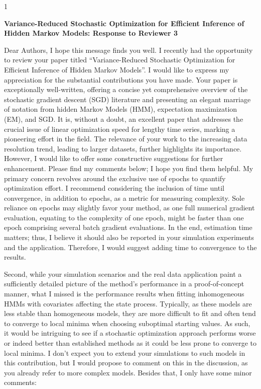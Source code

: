 \documentclass[11pt]{article}
\newcommand{\blind}{1}
\begin{document}
\blind
{
  \bigskip
  \bigskip
  \bigskip
  \begin{center}
    {\LARGE\bf Variance-Reduced Stochastic Optimization for Efficient Inference of Hidden Markov Models: Response to Reviewer 3}
  \end{center}
  \medskip
} \fi

Dear Authors,
I hope this message finds you well. I recently had the opportunity to review your paper titled “Variance-Reduced Stochastic Optimization for Efficient Inference of Hidden Markov Models”. I would like to express my appreciation for the substantial contributions you have made. Your paper is exceptionally well-written, offering a concise yet comprehensive overview of the stochastic gradient descent (SGD) literature and presenting an elegant marriage of notation from hidden Markov Models (HMM), expectation maximization (EM), and SGD. It is, without a doubt, an excellent paper that addresses the crucial issue of linear optimization speed for lengthy time series, marking a pioneering effort in the field. The relevance of your work to the increasing data resolution trend, leading to larger datasets, further highlights its importance. However, I would like to offer some constructive suggestions for further enhancement. Please find my comments below; I hope you find them helpful. My primary concern revolves around the exclusive use of epochs to quantify optimization effort. I recommend considering the inclusion of time until convergence, in addition to epochs, as a metric for measuring complexity. Sole reliance on epochs may slightly favor your method, as one full numerical gradient evaluation, equating to the complexity of one epoch, might be faster than one epoch comprising several batch gradient evaluations. In the end, estimation time matters; thus, I believe it should also be reported in your simulation experiments and the application. Therefore, I would suggest adding time to convergence to the results. 

Second, while your simulation scenarios and the real data application paint a sufficiently detailed picture of the method’s performance in a proof-of-concept manner, what I missed is the performance results when fitting inhomogeneous HMMs with covariates affecting the state process. Typically, as these models are less stable than homogeneous models, they are more difficult to fit and often tend to converge to local minima when choosing suboptimal starting values. As such, it would be intriguing to see if a stochastic optimization approach performs worse or indeed better than established methods as it could be less prone to converge to local minima. I don’t expect you to extend your simulations to such models in this contribution, but I would propose to comment on this in the discussion, as you already refer to more complex models. Besides that, I only have some minor comments: 
\end{document}
